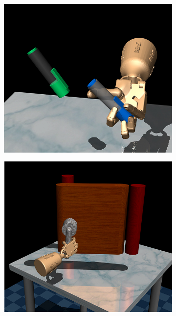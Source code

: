 \documentclass[conference]{IEEEtran}
\begin{document}
\begin{figure}[tpb]
    \center
    \hspace{0.04\textwidth}
    \begin{subfigure}[b]{0.3\textwidth}
        \center
        \includegraphics[height=0.8\linewidth]{figures/imgs/pen.jpg}
    \end{subfigure}
    \begin{subfigure}[b]{0.3\textwidth}
        \center
        \includegraphics[height=0.8\linewidth]{figures/imgs/door.jpg}
    \end{subfigure}
    \begin{subfigure}[b]{0.3\textwidth}

\end{subfigure}
\end{figure}
\end{document}
